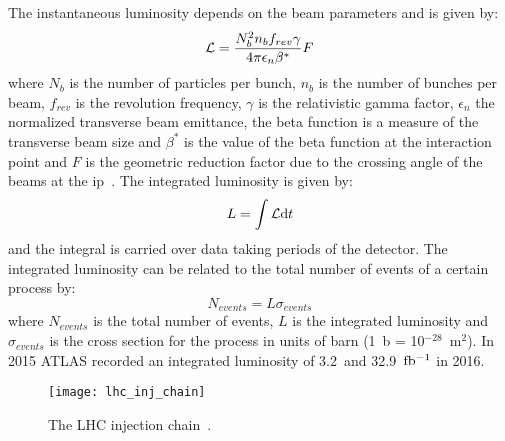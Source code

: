 The instantaneous luminosity depends on the beam parameters and is given by:
\begin{equation}
  \label{eq:70}
  \mathcal{L} = \frac{N^2_b n_b f_{rev} \gamma}{4 \pi \epsilon_n \beta^*} F
\end{equation}
where $N_b$ is the number of particles per bunch, $n_b$ is the number of bunches
per beam, $f_{rev}$ is the revolution frequency, $\gamma$ is the relativistic
gamma factor, $\epsilon_n$ the normalized transverse beam emittance, the beta
function is a measure of the transverse beam size and $\beta^*$ is the value of
the beta function at the interaction point and $F$ is the geometric reduction
factor due to the crossing angle of the beams at the \gls{ip}~\cite{LHC}. The
integrated luminosity is given by:
\begin{equation}
  \label{eq:71}
  L = \int \mathcal{L} \mathrm{d} t
\end{equation}
and the integral is carried over data taking periods of the detector. The
integrated luminosity can be related to the total number of events of a certain
process by:
\begin{equation}
  \label{eq:72}
  N_{events} = L \sigma_{events}
\end{equation}
where $N_{events}$ is the total number of events, $L$ is the integrated
luminosity and $\sigma_{events}$ is the cross section for the process in units
of barn (1~b = 10$^{-28}$~m$^2$). In 2015 ATLAS recorded an integrated
luminosity of 3.2~\ifb and 32.9~$\mbox{fb$^{-1}$}$ in 2016.
\begin{figure}[!h]
  \centering
    \texttt{[image: lhc\_inj\_chain]}
    \caption{The LHC injection chain~\cite{LHCFAQ}.}
    \label{fig:lhc_inj_chain}
\end{figure}
